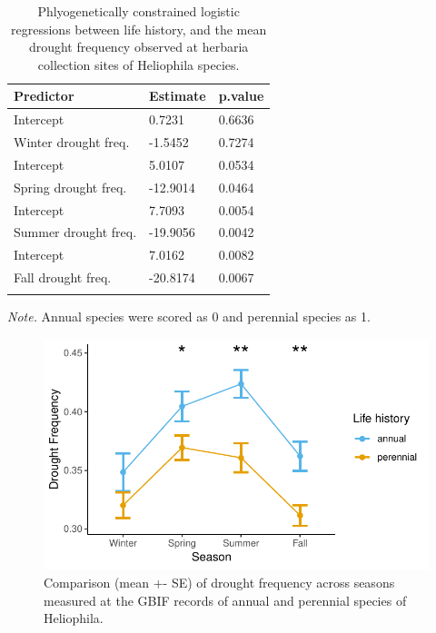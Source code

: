 \documentclass[man,floatsintext]{apa6}
\theoremstyle{definition}
\theoremstyle{definition}
\theoremstyle{definition}
\theoremstyle{remark}
\begin{document}
\begin{table}[tbp]
\begin{center}
\begin{threeparttable}
\caption{\label{tab:phylomodelstable}Phlyogenetically constrained logistic regressions between life history, and the mean drought frequency observed at herbaria collection sites of Heliophila species. }
\begin{tabular}{lll}
\toprule
Predictor & \multicolumn{1}{c}{Estimate} & \multicolumn{1}{c}{p.value}\\
\midrule
Intercept & 0.7231 & 0.6636\\
Winter drought freq. & -1.5452 & 0.7274\\ \midrule
Intercept & 5.0107 & 0.0534\\
Spring drought freq. & -12.9014 & 0.0464\\ \midrule
Intercept & 7.7093 & 0.0054\\
Summer drought freq. & -19.9056 & 0.0042\\ \midrule
Intercept & 7.0162 & 0.0082\\
Fall drought freq. & -20.8174 & 0.0067\\ \midrule
\bottomrule
\addlinespace
\end{tabular}
\begin{tablenotes}[para]
\normalsize{\textit{Note.} Annual species were scored as 0 and perennial species as 1.}
\end{tablenotes}
\end{threeparttable}
\end{center}
\end{table}





\begin{figure}
\centering
\includegraphics{../figures/life_history_drought_means_line.pdf}
\caption{\label{fig:lineplots}Comparison (mean +- SE) of drought frequency across
seasons measured at the GBIF records of annual and perennial species of
Heliophila.}
\end{figure}
\end{document}

